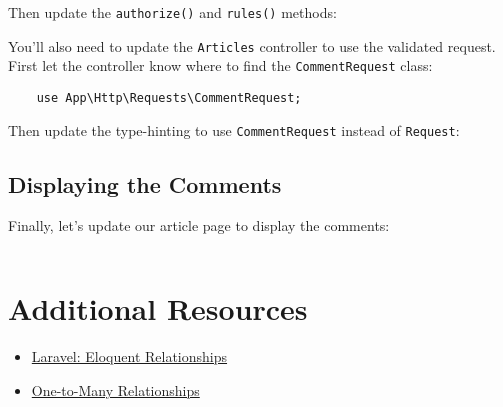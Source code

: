 Then update the \texttt{authorize()} and \texttt{rules()} methods:


You'll also need to update the \texttt{Articles} controller to use the validated request. First let the controller know where to find the \texttt{CommentRequest} class:

\begin{verbatim}
    use App\Http\Requests\CommentRequest;
\end{verbatim}

Then update the type-hinting to use \texttt{CommentRequest} instead of \texttt{Request}:



\subsection{Displaying the Comments}

Finally, let's update our article page to display the comments:

\inputminted{html}{11-one-to-many/figures/comments-list.blade.php}

\section{Additional Resources}

\begin{itemize}[leftmargin=*]
    \item \href{http://laravel.com/docs/7.x/eloquent-relationships}{Laravel: Eloquent Relationships}
    \item \href{https://mysql.programmingpedia.net/en/tutorial/9600/one-to-many}{One-to-Many Relationships}
\end{itemize}
